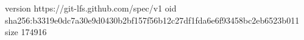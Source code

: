 version https://git-lfs.github.com/spec/v1
oid sha256:b3319e0dc7a30e9d0430b2bf157f56b12c27df1fda6e6f93458bc2eb6523b011
size 174916
